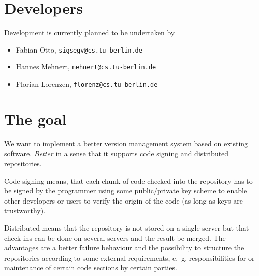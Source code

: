 \documentclass[fleqn, 10pt, a4paper]{article}
\begin{document}
\section{Developers}
Development is currently planned to be undertaken by
\begin{itemize}
\item Fabian Otto, \texttt{sigsegv@cs.tu-berlin.de}
\item Hannes Mehnert, \texttt{mehnert@cs.tu-berlin.de}
\item Florian Lorenzen, \texttt{florenz@cs.tu-berlin.de}
\end{itemize}

\section{The goal}
We want to implement a better version management system based on
existing software. \emph{Better} in a sense that it supports
code signing and distributed repositories.

Code signing means, that each chunk of code checked into the repository
has to be signed by the programmer using some public/private key scheme
to enable other developers or users to verify the origin of the code (as
long as keys are trustworthy).

Distributed means that the repository is not stored on a single server
but that check ins can be done on several servers and the result be
merged. The advantages are a better failure behaviour and the
possibility to structure the repositories according to some external
requirements, e.~g. responsibilities for or maintenance of certain code
sections by certain parties.
\end{document}
